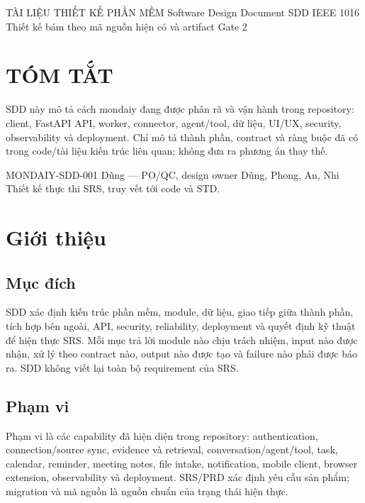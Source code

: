 \documentclass[12pt,a4paper]{article}
\begin{document}
\mondaiycover
  {TÀI LIỆU THIẾT KẾ PHẦN MỀM}
  {Software Design Document}
  {SDD}
  {IEEE 1016}
  {Thiết kế bám theo mã nguồn hiện có và artifact Gate 2}
\mondaiyfrontmatter

\section*{TÓM TẮT}
\begin{keybox}
SDD này mô tả cách mondaiy đang được phân rã và vận hành trong repository:
client, FastAPI API, worker, connector, agent/tool, dữ liệu, UI/UX, security,
observability và deployment. Chỉ mô tả thành phần, contract và ràng buộc đã có
trong code/tài liệu kiến trúc liên quan; không đưa ra phương án thay thế.
\end{keybox}

\mondaiymetadata
  {MONDAIY-SDD-001}
  {Dũng --- PO/QC, design owner}
  {Dũng, Phong, An, Nhi}
  {Thiết kế thực thi SRS, truy vết tới code và STD.}

\section{Giới thiệu}
\subsection{Mục đích}
SDD xác định kiến trúc phần mềm, module, dữ liệu, giao tiếp giữa thành phần,
tích hợp bên ngoài, API, security, reliability, deployment và quyết định kỹ
thuật để hiện thực SRS. Mỗi mục trả lời module nào chịu trách nhiệm, input nào
được nhận, xử lý theo contract nào, output nào được tạo và failure nào phải
được báo ra. SDD không viết lại toàn bộ requirement của SRS.

\subsection{Phạm vi}
Phạm vi là các capability đã hiện diện trong repository: authentication,
connection/source sync, evidence và retrieval, conversation/agent/tool, task,
calendar, reminder, meeting notes, file intake, notification, mobile client,
browser extension, observability và deployment. SRS/PRD xác định yêu cầu sản
phẩm; migration và mã nguồn là nguồn chuẩn của trạng thái hiện thực.
\end{document}
